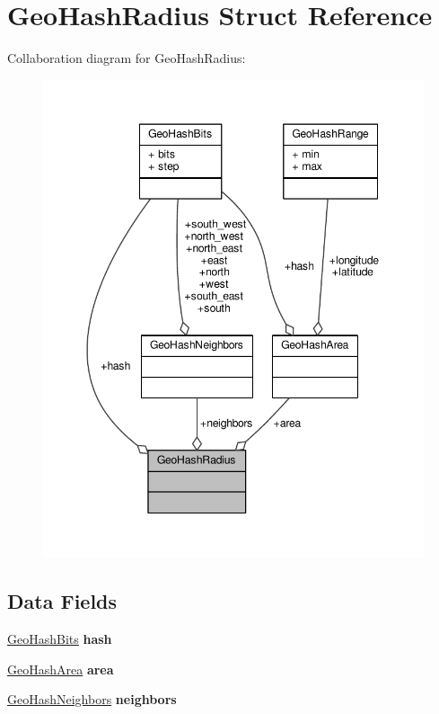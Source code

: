 \hypertarget{structGeoHashRadius}{}\section{Geo\+Hash\+Radius Struct Reference}
\label{structGeoHashRadius}


Collaboration diagram for Geo\+Hash\+Radius\+:\nopagebreak
\begin{figure}[H]
\begin{center}
\leavevmode
\includegraphics[width=348pt]{structGeoHashRadius__coll__graph}
\end{center}
\end{figure}
\subsection*{Data Fields}
\begin{DoxyCompactItemize}
\item 
\mbox{\label{structGeoHashRadius_aa78f47b3fcc9be6d39f10f3e2733b724}} 
\hyperlink{structGeoHashBits}{Geo\+Hash\+Bits} {\bfseries hash}
\item 
\mbox{\label{structGeoHashRadius_a1df5fd77037c3aa4273769fb2e85c542}} 
\hyperlink{structGeoHashArea}{Geo\+Hash\+Area} {\bfseries area}
\item 
\mbox{\label{structGeoHashRadius_a5ea82458e6805a39b459ba018b8dc0f1}} 
\hyperlink{structGeoHashNeighbors}{Geo\+Hash\+Neighbors} {\bfseries neighbors}
\end{DoxyCompactItemize}


